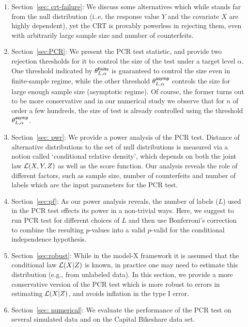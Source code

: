 \documentclass[11pt]{article}
\begin{document}
\begin{enumerate}
\item Section~\ref{sec: crt-failure}: We discuss some alternatives which while stands far from the null distribution (i..e, the response value $Y$ and the covariate $X$ are highly dependent), yet the CRT is provably powerless in rejecting them, even with arbitrarily large sample size and number of counterfeits.

\item Section~\ref{sec:PCR}: We present the PCR test statistic, and provide two rejection thresholds for it to control the size of the test under a target level 
$\alpha$. One threshold indicated by $\theta_{L,\alpha}^{\mathsf{finite}}$ is guaranteed to control the size even in finite-sample regime, while the other threshold $\theta_{L,\alpha}^{\mathsf{asymp}}$ controls the size for large enough sample size (asymptotic regime). Of course, the former turns out to be more conservative and in our numerical study we observe that for $n$ of order a few hundreds, the size of test is already controlled using the  threshold $\theta_{L,\alpha}^{\mathsf{asymp}}$.    

\item Section~\ref{sec: pwr}: We provide a power analysis of the PCR test. Distance of alternative distributions to the set of null distributions is measured via a notion called `conditional relative density', which depends on both the joint law $\mathcal{L}(X,Y,Z)$ as well as the score function. Our analysis reveals the role of different factors, such as sample size, number of counterfeits and number of labels which are the input parameters for the PCR test.  

\item Section~\ref{sec:pf}: As our power analysis reveals, the number of labels ($L$) used in the PCR test effects its power in a non-trivial ways. Here, we suggest to run PCR test for different choices of $L$ and then use Bonferroni's correction to combine the resulting $p$-values into a valid $p$-valid for the conditional independence hypothesis.

\item Section~\ref{sec:robust}: While in the model-X framework it is assumed that the conditional law $\mathcal{L}(X|Z)$ is known, in practice one may need to estimate this distribution (e.g., from unlabeled data). In this section, we provide a more conservative version of the PCR test which is more robust to errors in estimating $\mathcal{L}(X|Z)$, and avoids inflation in the type I error.
\item Section~\ref{sec: numerical}: We evaluate the performance of the PCR test on several  simulated data and on the Capital Bikeshare data set.
\end{enumerate}
\end{document}
